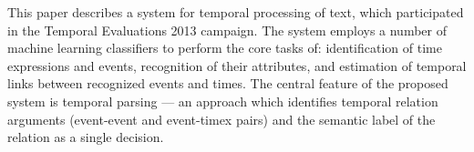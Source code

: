 This paper describes a system for temporal processing of text, which participated in the
 Temporal Evaluations 2013 campaign. The
 system employs a number of machine learning
 classifiers to perform the core tasks of: identification
 of time expressions and events, recognition
 of their attributes, and estimation of
 temporal links between recognized events and
 times. The central feature of the proposed system
 is temporal parsing --- an approach which
 identifies temporal relation arguments (event-event
 and event-timex pairs) and the semantic
 label of the relation as a single decision.


